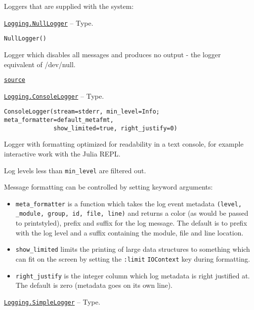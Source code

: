 Loggers that are supplied with the system:


\hypertarget{15508205197393226825}{} 
\hyperlink{15508205197393226825}{\texttt{Logging.NullLogger}}  -- {Type.}

\begin{adjustwidth}{2em}{0pt}


\begin{verbatim}
NullLogger()
\end{verbatim}

Logger which disables all messages and produces no output - the logger equivalent of /dev/null.



\href{https://github.com/JuliaLang/julia/blob/44fa15b1502a45eac76c9017af94332d4557b251/base/logging.jl#L75-L80}{\texttt{source}}


\end{adjustwidth}
\hypertarget{14105182192150729642}{} 
\hyperlink{14105182192150729642}{\texttt{Logging.ConsoleLogger}}  -- {Type.}

\begin{adjustwidth}{2em}{0pt}


\begin{verbatim}
ConsoleLogger(stream=stderr, min_level=Info; meta_formatter=default_metafmt,
              show_limited=true, right_justify=0)
\end{verbatim}

Logger with formatting optimized for readability in a text console, for example interactive work with the Julia REPL.

Log levels less than \texttt{min\_level} are filtered out.

Message formatting can be controlled by setting keyword arguments:

\begin{itemize}
\item \texttt{meta\_formatter} is a function which takes the log event metadata \texttt{(level, \_module, group, id, file, line)} and returns a color (as would be passed to printstyled), prefix and suffix for the log message.  The default is to prefix with the log level and a suffix containing the module, file and line location.


\item \texttt{show\_limited} limits the printing of large data structures to something which can fit on the screen by setting the \texttt{:limit} \texttt{IOContext} key during formatting.


\item \texttt{right\_justify} is the integer column which log metadata is right justified at. The default is zero (metadata goes on its own line).

\end{itemize}


\end{adjustwidth}
\hypertarget{206724342092815568}{} 
\hyperlink{206724342092815568}{\texttt{Logging.SimpleLogger}}  -- {Type.}


